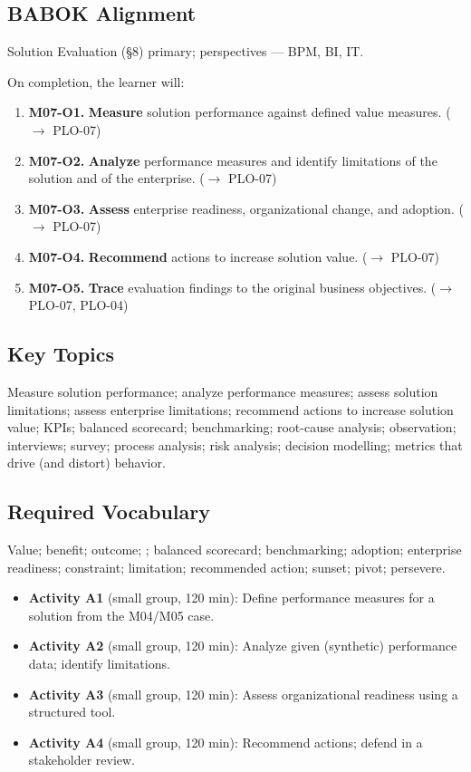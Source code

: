\documentclass[11pt,letterpaper,oneside]{report}
\begin{document}
\subsection*{BABOK Alignment}
Solution Evaluation (\S8) primary; perspectives --- BPM, BI, IT.

\begin{outcomes}
On completion, the learner will:
\begin{enumerate}
  \item \textbf{M07-O1.} \textbf{Measure} solution performance against defined value measures. ($\to$ PLO-07)
  \item \textbf{M07-O2.} \textbf{Analyze} performance measures and identify limitations of the solution and of the enterprise. ($\to$ PLO-07)
  \item \textbf{M07-O3.} \textbf{Assess} enterprise readiness, organizational change, and adoption. ($\to$ PLO-07)
  \item \textbf{M07-O4.} \textbf{Recommend} actions to increase solution value. ($\to$ PLO-07)
  \item \textbf{M07-O5.} \textbf{Trace} evaluation findings to the original business objectives. ($\to$ PLO-07, PLO-04)
\end{enumerate}
\end{outcomes}

\subsection*{Key Topics}
Measure solution performance; analyze performance measures; assess solution limitations; assess enterprise limitations; recommend actions to increase solution value; KPIs; balanced scorecard; benchmarking; root-cause analysis; observation; interviews; survey; process analysis; risk analysis; decision modelling; metrics that drive (and distort) behavior.

\subsection*{Required Vocabulary}
Value; benefit; outcome; ; balanced scorecard; benchmarking; adoption; enterprise readiness; constraint; limitation; recommended action; sunset; pivot; persevere.

\begin{labbox}
\begin{itemize}
  \item \textbf{Activity A1} (small group, 120 min): Define performance measures for a solution from the M04/M05 case.
  \item \textbf{Activity A2} (small group, 120 min): Analyze given (synthetic) performance data; identify limitations.
  \item \textbf{Activity A3} (small group, 120 min): Assess organizational readiness using a structured tool.
  \item \textbf{Activity A4} (small group, 120 min): Recommend actions; defend in a stakeholder review.
\end{itemize}
\end{labbox}
\end{document}
